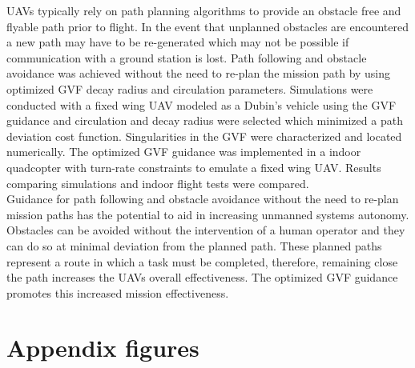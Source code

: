 \documentclass[numbered,pdftex]{ohio-etd}
\begin{document}
UAVs typically rely on path planning algorithms to provide an obstacle free and flyable path prior to flight. In the event that unplanned obstacles are encountered a new path may have to be re-generated which may not be possible if communication with a ground station is lost. Path following and obstacle avoidance was achieved without the need to re-plan the mission path by using optimized GVF decay radius and circulation parameters. Simulations were conducted with a fixed wing UAV modeled as a Dubin's vehicle using the GVF guidance and circulation and decay radius were selected which minimized a path deviation cost function. Singularities in the GVF were characterized and located numerically. The optimized GVF guidance was implemented in a indoor quadcopter with turn-rate constraints to emulate a fixed wing UAV. Results comparing simulations and indoor flight tests were compared. \\

Guidance for path following and obstacle avoidance without the need to re-plan mission paths has the potential to aid in increasing unmanned systems autonomy. Obstacles can be avoided without the intervention of a human operator and they can do so at minimal deviation from the planned path. These planned paths represent a route in which a task must be completed, therefore, remaining close the path increases the UAVs overall effectiveness. The optimized GVF guidance promotes this increased mission effectiveness. 



\chapter{Appendix figures}
\end{document}
